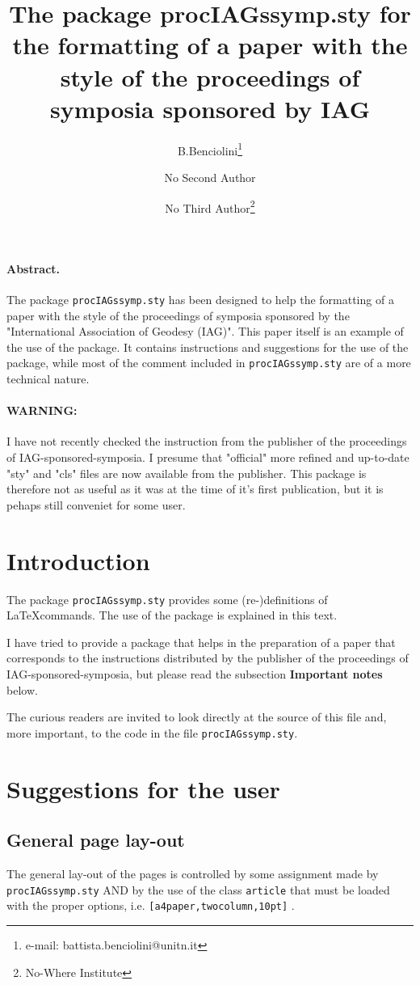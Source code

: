 \documentclass[a4paper,twocolumn,10pt]{article} %
\title{The package procIAGssymp.sty for the formatting  
       of a paper with the style of the proceedings of 
       symposia sponsored by IAG}
\author{B.Benciolini\thanks{e-mail: battista.benciolini@unitn.it}
\and  No Second Author \and  No Third Author\thanks{No-Where Institute}}
\date{ }
\begin{document}
\maketitle 
\paragraph{Abstract.}  The package \texttt{procIAGssymp.sty} has  
been designed to help the  formatting of a paper with the style 
of the proceedings of symposia sponsored by the 
"International Association of Geodesy (IAG)".
This  paper itself is an example of the use of the package. It 
contains instructions and suggestions for the use of the package, 
while most of the comment included in \texttt{procIAGssymp.sty} 
are of a more technical nature.
\paragraph{WARNING:}
I have not recently checked the instruction from 
the publisher of the proceedings of IAG-sponsored-symposia. 
I presume that "official" more refined and 
up-to-date "sty" and "cls" files 
are now available from the publisher.
This package is therefore not as useful 
as it was at the time of it's first publication, 
but it is pehaps still conveniet for some user.
\linea
\section{Introduction}
The package \texttt{procIAGssymp.sty} provides some (re-)definitions 
of \LaTeX commands.  The use of the package is explained in this text.
\par\noindent I have tried to provide a package that helps in 
the preparation of a paper that corresponds to the instructions 
distributed by the publisher of the proceedings of 
IAG-sponsored-symposia, but please read the subsection 
\textbf{Important notes} below.
\par\noindent The curious readers are 
invited to look directly at the source of this file and, more 
important, to the  code in the file \texttt{procIAGssymp.sty}. 
\section{Suggestions for the user}
\subsection{General page lay-out}
The general lay-out of the pages is controlled by some assignment 
made by \texttt{procIAGssymp.sty} AND by the use of the class 
\texttt{article} that must be loaded with the proper options, i.e. 
\verb+[a4paper,twocolumn,10pt]+ .
\end{document}
